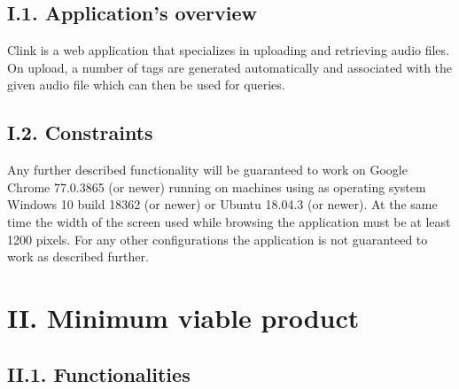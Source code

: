 \documentclass[11pt, a4papper]{report}
\theoremstyle{plain}
\theoremstyle{definition}
\theoremstyle{definition}
\theoremstyle{proposition}
\begin{document}
\section*{I.1. Application's overview}

Clink is a web application that specializes in uploading and retrieving audio files. On upload, a number of tags are generated automatically and associated with the given audio file which can then be used for queries.

\section*{I.2. Constraints}

Any further described functionality will be guaranteed to work on Google Chrome 77.0.3865 (or newer) running on machines using as operating system Windows 10 build 18362 (or newer) or Ubuntu 18.04.3 (or newer). At the same time the width of the screen used while browsing the application must be at least 1200 pixels. For any other configurations the application is not guaranteed to work as described further.

\chapter*{II. Minimum viable product}

\section*{II.1. Functionalities}
\end{document}
